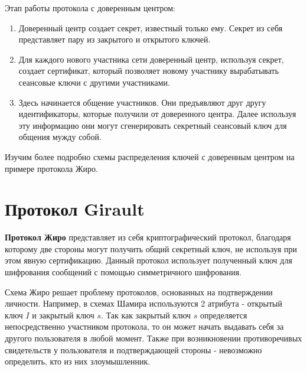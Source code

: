 \documentclass[a4paper]{article}
\begin{document}
Этап работы протокола с доверенным центром:
\begin{enumerate}
    \item Доверенный центр создает секрет, известный только ему. Секрет из себя представляет пару из закрытого и открытого ключей.
    \item Для каждого нового участника сети доверенный центр, используя секрет, создает сертификат, который позволяет новому участнику 
    вырабатывать сеансовые ключи с другими участниками.
    \item Здесь начинается общение участников. Они предъявляют друг другу идентификаторы, которые получили от доверенного центра. Далее используя эту информацию они могут сгенерировать секретный сеансовый ключ для общения мужду собой.
\end{enumerate}

Изучим более подробно схемы распределения ключей с доверенным центром на примере протокола Жиро. 
\section{Протокол Girault}

\textbf{Протокол Жиро} представляет из себя криптографический протокол, благодаря которому две стороны могут получить общий секретный ключ, не используя при этом явную сертификацию. 
Данный протокол использует полученный ключ для шифрования сообщений с помощью симметричного шифрования.

Схема Жиро решает проблему протоколов, основанных на подтверждении личности. Например, в схемах Шамира используются 2 атрибута - открытый ключ $I$ и закрытый ключ $s$. Так как закрытый ключ $s$ определяется непосредственно участником протокола, то он может начать выдавать себя за другого пользователя в любой момент.
Также при возникновении противоречивых свидетельств у пользователя и подтверждающей стороны - невозможно определить, кто из них злоумышленник.
\end{document}
